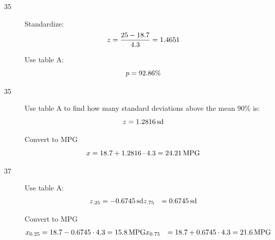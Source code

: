 \documentclass{exam}
\begin{document}
\begin{description}

      \item[35]
        Standardize:
        \[
          z = \frac{25 - 18.7}{4.3} = 1.4651 \\
        \]

        Use table A: 
        \[
          p = 92.86 \% \\
        \]

      \item[35]
        Use table A to find how many standard deviations above the mean 90\% is: 
        \[
          z = \unit[1.2816]{sd}
        \]

        Convert to MPG
        \[
          x = 18.7 + 1.2816 \cdot 4.3 = \unit[24.21]{MPG}
        \]

      \item[37]
        Use table A: 
        \begin{align*}
          z_{.25} &= \unit[-0.6745]{sd}
          z_{.75} &= \unit[0.6745]{sd}
        \end{align*}

        Convert to MPG
        \begin{align*}
          x_{0.25} &= 18.7 - 0.6745 \cdot 4.3 = \unit[15.8]{MPG}
          x_{0.75} &= 18.7 + 0.6745 \cdot 4.3 = \unit[21.6]{MPG}
        \end{align*}


\end{description}
\end{document}
